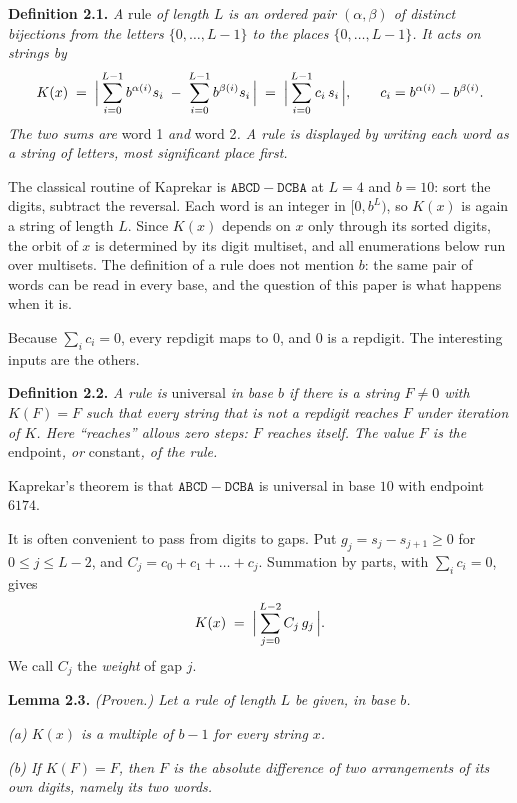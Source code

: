 \documentclass[11pt,letterpaper]{article}
\theoremstyle{paperstyle}
\theoremstyle{paperstyledef}
\theoremstyle{paperstylerem}
\begin{document}
\textbf{Definition 2.1.} \emph{A} rule \emph{of length \(L\) is an ordered pair \((\alpha, \beta)\) of distinct bijections from the letters \(\{0, \dots, L-1\}\) to the places \(\{0, \dots, L-1\}\). It acts on strings by} \[K(x) \;=\; \Bigl|\, \sum_{i=0}^{L-1} b^{\alpha(i)} s_i \;-\; \sum_{i=0}^{L-1} b^{\beta(i)} s_i \,\Bigr| \;=\; \Bigl|\, \sum_{i=0}^{L-1} c_i\, s_i \,\Bigr|, \qquad c_i = b^{\alpha(i)} - b^{\beta(i)}.\] \emph{The two sums are} word 1 \emph{and} word 2\emph{. A rule is displayed by writing each word as a string of letters, most significant place first.}

The classical routine of Kaprekar is \(\mathtt{ABCD} - \mathtt{DCBA}\) at \(L = 4\) and \(b = 10\): sort the digits, subtract the reversal. Each word is an integer in \([0, b^L)\), so \(K(x)\) is again a string of length \(L\). Since \(K(x)\) depends on \(x\) only through its sorted digits, the orbit of \(x\) is determined by its digit multiset, and all enumerations below run over multisets. The definition of a rule does not mention \(b\): the same pair of words can be read in every base, and the question of this paper is what happens when it is.

Because \(\sum_i c_i = 0\), every repdigit maps to \(0\), and \(0\) is a repdigit. The interesting inputs are the others.

\textbf{Definition 2.2.} \emph{A rule is} universal \emph{in base \(b\) if there is a string \(F \neq 0\) with \(K(F) = F\) such that every string that is not a repdigit reaches \(F\) under iteration of \(K\). Here ``reaches'' allows zero steps: \(F\) reaches itself. The value \(F\) is the} endpoint\emph{, or} constant\emph{, of the rule.}

Kaprekar's theorem is that \(\mathtt{ABCD} - \mathtt{DCBA}\) is universal in base \(10\) with endpoint \(6174\).

It is often convenient to pass from digits to gaps. Put \(g_j = s_j - s_{j+1} \geq 0\) for \(0 \leq j \leq L-2\), and \(C_j = c_0 + c_1 + \dots + c_j\). Summation by parts, with \(\sum_i c_i = 0\), gives \[K(x) \;=\; \Bigl|\, \sum_{j=0}^{L-2} C_j\, g_j \,\Bigr|.\] We call \(C_j\) the \emph{weight} of gap \(j\).

\textbf{Lemma 2.3.} \emph{(Proven.) Let a rule of length \(L\) be given, in base \(b\).}

\emph{(a) \(K(x)\) is a multiple of \(b - 1\) for every string \(x\).}

\emph{(b) If \(K(F) = F\), then \(F\) is the absolute difference of two arrangements of its own digits, namely its two words.}
\end{document}
